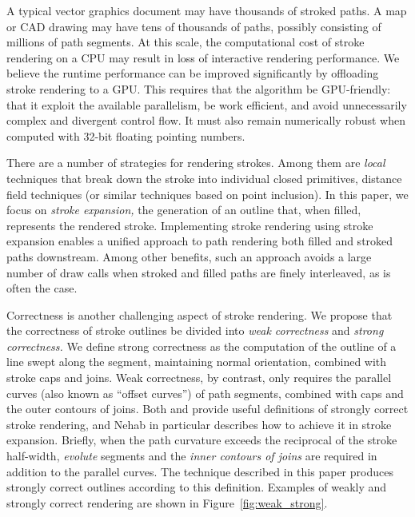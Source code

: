 \documentclass[sigconf, nonacm]{acmart}
\begin{document}
A typical vector graphics document may have thousands of stroked paths. A map or CAD drawing may have tens of thousands of paths, possibly consisting of millions of path segments. At this scale, the computational cost of stroke rendering on a CPU may result in loss of interactive rendering performance. We believe the runtime performance can be improved significantly by offloading stroke rendering to a GPU. This requires that the algorithm be GPU-friendly: that it exploit the available parallelism, be work efficient, and avoid unnecessarily complex and divergent control flow. It must also remain numerically robust when computed with 32-bit floating pointing numbers.

There are a number of strategies for rendering strokes. Among them are \emph{local} techniques that break down the stroke into individual closed primitives, distance field techniques (or similar techniques based on point inclusion). In this paper, we focus on \emph{stroke expansion,} the generation of an outline that, when filled, represents the rendered stroke. Implementing stroke rendering using stroke expansion enables a unified approach to path rendering both filled and stroked paths downstream. Among other benefits, such an approach avoids a large number of draw calls when stroked and filled paths are finely interleaved, as is often the case.

Correctness is another challenging aspect of stroke rendering. We propose that the correctness of stroke outlines be divided into \emph{weak correctness} and \emph{strong correctness.} We define strong correctness as the computation of the outline of a line swept along the segment, maintaining normal orientation, combined with stroke caps and joins. Weak correctness, by contrast, only requires the parallel curves (also known as ``offset curves'') of path segments, combined with caps and the outer contours of joins. Both \citet{Nehab2020} and \citet{Kilgard2020} provide useful definitions of strongly correct stroke rendering, and Nehab in particular describes how to achieve it in stroke expansion. Briefly, when the path curvature exceeds the reciprocal of the stroke half-width, \emph{evolute} segments and the \emph{inner contours of joins} are required in addition to the parallel curves. The technique described in this paper produces strongly correct outlines according to this definition. Examples of weakly and strongly correct rendering are shown in Figure~\ref{fig:weak_strong}.
\end{document}
